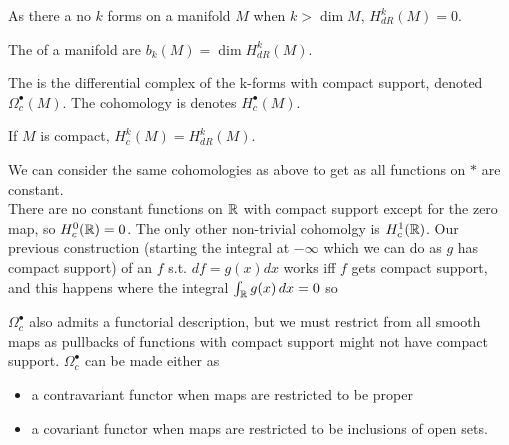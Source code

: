 \documentclass{article}
\begin{document}
\begin{remark}
	As there a no $k$ forms on a manifold $M$ when $k > \dim M$, $H^k_{dR}(M)=0$.
\end{remark}

\begin{definition}
	The  of a manifold are $b_k(M) = \dim H_{dR}^k(M)$. 
\end{definition}

\begin{definition}
	The  is the differential complex of the k-forms with compact support, denoted $\Omega_c^\bullet(M)$. The cohomology is denotes $H_c^\bullet(M)$.
\end{definition}

\begin{prop}
	If $M$ is compact, $H_c^k(M) = H_{dR}^k(M)$.
\end{prop}

\begin{example}
	We can consider the same cohomologies as above to get 
	as all functions on $\ast$ are constant. \\
	There are no constant functions on $\mathbb{R}$ with compact support except for the zero map, so $H^0_c(\mathbb{R})=0$. The only other non-trivial cohomolgy is $H^1_c(\mathbb{R})$. Our previous construction (starting the integral at $-\infty$ which we can do as $g$ has compact support) of an $f$ s.t. $df = g(x)dx$ works iff $f$ gets compact support, and this happens where the integral $\int_{\mathbb{R}} g(x) \, dx = 0$ so 
\end{example}

\begin{remark}
	$\Omega_c^\bullet$ also admits a functorial description, but we must restrict from all smooth maps as pullbacks of functions with compact support might not have compact support. $\Omega_c^\bullet$ can be made either as 
	\begin{itemize}
		\item a contravariant functor when maps are restricted to be proper
		\item a covariant functor when maps are restricted to be inclusions of open sets.
	\end{itemize}	
\end{remark}
\end{document}
